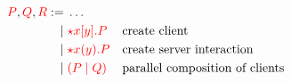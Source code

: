\begin{definition}[Terms]\label{def:nc-terms}
  \[\!
    \begin{aligned}
      \textcolor{red}{P}, \textcolor{red}{Q}, \textcolor{red}{R}
           :=& \; \dots
      \\ \mid& \; \textcolor{red}{{\star}{x}[y].P} &&\text{create client}
      \\ \mid& \; \textcolor{red}{{\star}{x}(y).P} &&\text{create server interaction}
      \\ \mid& \; \textcolor{red}{(P \mid Q)}   &&\text{parallel composition of clients}
    \end{aligned}
  \]
\end{definition}
